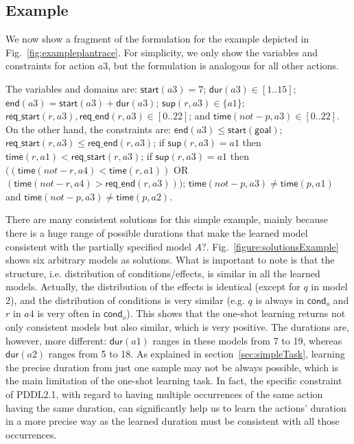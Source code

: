 \documentclass{ecai}
\newcommand{\cond}{\mathsf{cond}}  %
\newcommand{\dur}{\mathsf{dur}}    %
\newcommand{\start}{\mathsf{start}}%
\newcommand{\en}{\mathsf{end}}     %
\newcommand{\supp}{\mathsf{sup}}   %
\newcommand{\tim}{\mathsf{time}}   %
\newcommand{\reqs}{\mathsf{req\_{start}}} %
\newcommand{\reqe}{\mathsf{req\_{end}}}   %
\newcommand{\goal}{\mathsf{goal}}  %
\begin{document}
\subsection{Example}
\label{sec:example}

We now show a fragment of the formulation for the example depicted in Fig.~\ref{fig:exampleplantrace}. For simplicity, we only show the variables and constraints for action $a3$, but the formulation is analogous for all other actions.

The variables and domains are: $\start(a3)=7$; $\dur(a3) \in [1..15]$; $\en(a3)=\start(a3)+\dur(a3)$; $\supp(r,a3) \in \{a1\}$; $\reqs(r,a3),\reqe(r,a3) \in [0..22]$; and $\tim(not-p,a3) \in [0..22]$.
On the other hand, the constraints are: $\en(a3) \leq \start(\goal)$; $\reqs(r,a3) \leq \reqe(r,a3)$; if $\supp(r,a3)=a1$ then $\tim(r,a1) < \reqs(r,a3)$; if $\supp(r,a3)=a1$ then $((\tim(not-r,a4) < \tim(r,a1))$ OR $(\tim(not-r,a4) > \reqe(r,a3)))$; $\tim(not-p,a3) \neq \tim(p,a1)$ and $\tim(not-p,a3) \neq \tim(p,a2)$.

There are many consistent solutions for this simple example, mainly because there is a huge range of possible durations that make the learned model consistent with the partially specified model $A?$.
Fig.~\ref{figure:solutionsExample} shows six arbitrary models as solutions. What is important to note is that the structure, i.e. distribution of conditions/effects, is similar in all the learned models. Actually, the distribution of the effects is identical (except for $q$ in model 2), and the distribution of conditions is very similar (e.g. $q$ is always in $\cond_o$ and $r$ in $a4$ is very often in $\cond_o$).
This shows that the one-shot learning returns not only consistent models but also similar, which is very positive.
The durations are, however, more different: $\dur(a1)$ ranges in these models from 7 to 19, whereas $\dur(a2)$ ranges from 5 to 18. As explained in section~\ref{sec:simpleTask}, learning the precise duration from just one sample may not be always possible, which is the main limitation of the one-shot learning task.
In fact, the specific constraint of PDDL2.1, with regard to having multiple occurrences of the same action having the same duration, can significantly help us to learn the actions' duration in a more precise way as the learned duration must be consistent with all those occurrences.
\end{document}
